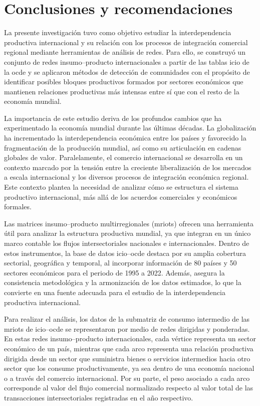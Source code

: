 \chapter{Conclusiones y recomendaciones}


La presente investigación tuvo como objetivo estudiar la interdependencia productiva internacional y su relación con los procesos de integración comercial regional mediante herramientas de análisis de redes. Para ello, se construyó un conjunto de redes insumo--producto internacionales a partir de las tablas \gls{icio} de la \gls{ocde} y se aplicaron métodos de detección de comunidades con el propósito de identificar posibles bloques productivos formados por sectores económicos que mantienen relaciones productivas más intensas entre sí que con el resto de la economía mundial. 

La importancia de este estudio deriva de los profundos cambios que ha experimentado la economía mundial durante las últimas décadas. La globalización ha incrementado la interdependencia económica entre los países y favorecido la fragmentación de la producción mundial, así como su articulación en cadenas globales de valor. Paralelamente, el comercio internacional se desarrolla en un contexto marcado por la tensión entre la creciente liberalización de los mercados a escala internacional y los diversos procesos de integración económica regional. Este contexto plantea la necesidad de analizar cómo se estructura el sistema productivo internacional, más allá de los acuerdos comerciales y económicos formales.

Las matrices insumo--producto multirregionales (\glspl{mriot}) ofrecen una herramienta útil para analizar la estructura productiva mundial, ya que integran en un único marco contable los flujos intersectoriales nacionales e internacionales. Dentro de estos instrumentos, la base de datos \gls{icio}--\gls{ocde} destaca por su amplia cobertura sectorial, geográfica y temporal, al incorporar información de 
80 países y 50 sectores económicos para el periodo de 1995 a 2022. Además, asegura la consistencia metodológica y la armonización de los datos estimados, lo que la convierte en una fuente adecuada para el estudio de la interdependencia productiva internacional.

Para realizar el análisis, los datos de la submatriz de consumo intermedio de las \glspl{mriot} de \gls{icio}--\gls{ocde} se representaron por medio de redes dirigidas y ponderadas. En estas redes insumo--producto internacionales, cada vértice representa un sector económico de un país, mientras que cada arco representa una relación productiva dirigida desde un sector que suministra bienes o servicios intermedios hacia otro sector que los consume productivamente, ya sea dentro de una economía nacional o a través del comercio internacional. Por su parte, el peso asociado a cada arco corresponde al valor del flujo comercial normalizado respecto al valor total de las transacciones intersectoriales registradas en el año respectivo.


